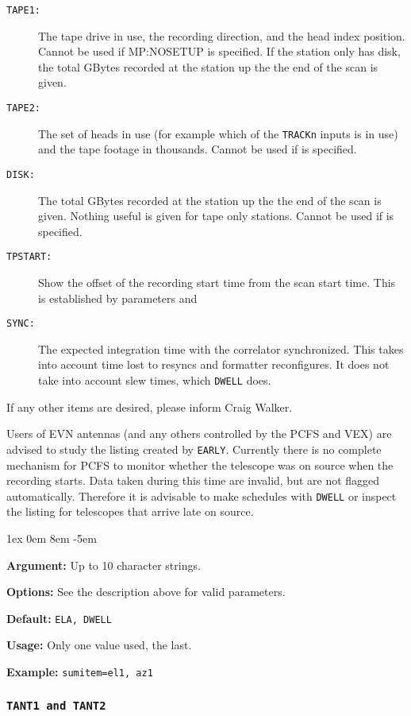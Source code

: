 \documentclass{report}
\newcommand{\rcwbox}[5]{
  \begin{list}{}{\parsep 1ex  \itemsep 0em
                 \leftmargin 8em  \itemindent -5em }
    \item {\bf Argument:} #1
    \item {\bf Options:}  #2
    \item {\bf Default:}  #3
    \item {\bf Usage:}    #4
    \item {\bf Example:}  #5
  \end{list}
}
\begin{document}
\begin{description}
\item[{\tt TAPE1:}]  The tape drive in use, the recording direction,
and the head index position.  Cannot be used if 
{MP:NOSETUP} is specified.  If the station only has disk, the
total GBytes recorded at the station up the the end of the scan is
given.

\item[{\tt TAPE2:}]  The set of heads in use (for example which of the
{\tt TRACKn} inputs is in use) and the tape footage in thousands.
Cannot be used if  is specified.

\item[{\tt DISK:}] The total GBytes recorded at the station up the
the end of the scan is given.  Nothing useful is given for tape only
stations.  Cannot be used if  is
specified.

\item[{\tt TPSTART:}] Show the offset of the recording start time from the
scan start time.  This is established by parameters  and 

\item[{\tt SYNC:}]  The expected integration time with the correlator
synchronized.  This takes into account time lost to resyncs and
formatter reconfigures.  It does not take into account slew times, which
{\tt DWELL} does.

\end{description}

If any other items are desired, please inform Craig Walker.

Users of EVN antennas (and any others controlled by the PCFS and VEX)
are advised to study the listing created by {\tt EARLY}.  Currently
there is no complete mechanism for PCFS to monitor whether the
telescope was on source when the recording starts. Data taken
during this time are invalid, but are not flagged automatically.
Therefore it is advisable to make schedules with {\tt DWELL} or
inspect the listing for telescopes that arrive late on source.

\rcwbox
{Up to 10 character strings.}
{See the description above for valid parameters.}
{{\tt ELA, DWELL}}
{Only one value used, the last.}
{{\tt sumitem=el1, az1}}


\subsubsection{\label{MP:TANT1}{\tt TANT1 and TANT2}}
\end{document}
